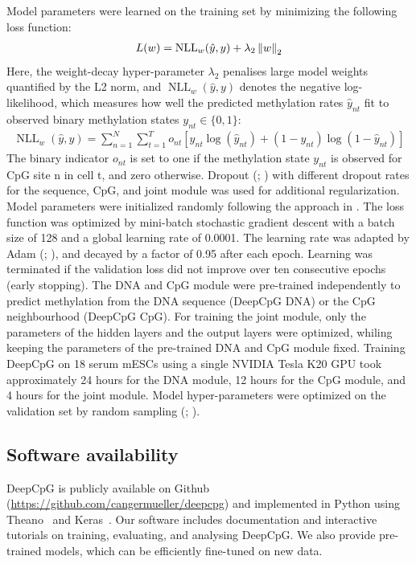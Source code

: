 Model parameters were learned on the training set by minimizing the following loss function:
\newcommand{\Xnll}{\operatorname{NLL}_w(\hat{y},y)}
\begin{align}
  L(w)=\Xnll+\lambda_2 \norm{w}_2
\end{align}
Here, the weight-decay hyper-parameter $\lambda_2$ penalises large model weights quantified by the L2 norm, and $\Xnll$ denotes the negative log-likelihood, which measures how well the predicted methylation rates $\hat{y}_{nt}$ fit to observed binary methylation states $y_{nt}\in\{0,1\}$:
\begin{align}
  \Xnll=\sum_{n=1}^N \sum_{t=1}^T o_{nt}\left[y_{nt} \log(\hat{y}_{nt}) + (1-y_{nt}) \log(1-\hat{y}_{nt})\right]
\end{align}
The binary indicator $o_{nt}$ is set to one if the methylation state $y_{nt}$ is observed for CpG site n in cell t, and zero otherwise. Dropout (\citep{srivastava_dropout:_2014}; ) with different dropout rates for the sequence, CpG, and joint module was used for additional regularization. Model parameters were initialized randomly following the approach in \citet{glorot_understanding_2010}. The loss function was optimized by mini-batch stochastic gradient descent with a batch size of 128 and a global learning rate of 0.0001. The learning rate was adapted by Adam (\citep{kingma_adam:_2014}; ), and decayed by a factor of 0.95 after each epoch. Learning was terminated if the validation loss did not improve over ten consecutive epochs (early stopping). The DNA and CpG module were pre-trained independently to predict methylation from the DNA sequence (DeepCpG DNA) or the CpG neighbourhood (DeepCpG CpG). For training the joint module, only the parameters of the hidden layers and the output layers were optimized, whiling keeping the parameters of the pre-trained DNA and CpG module fixed. Training DeepCpG on 18 serum mESCs using a single NVIDIA Tesla K20 GPU took approximately 24 hours for the DNA module, 12 hours for the CpG module, and 4 hours for the joint module. Model hyper-parameters were optimized on the validation set by random sampling (\citep{bengio_practical_2012}; ).


\subsection{Software availability}

DeepCpG is publicly available on Github (\url{https://github.com/cangermueller/deepcpg}) and implemented in Python using Theano~\citep{bastien_theano:_2012} and Keras~\citep{chollet_keras:_2015}. Our software includes documentation and interactive tutorials on training, evaluating, and analysing DeepCpG. We also provide pre-trained models, which can be efficiently fine-tuned on new data.


